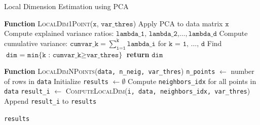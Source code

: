\documentclass[11pt,a4paper]{article}
\begin{document}
\begin{algorithm}
	\caption{Local Dimension Estimation using PCA}
	\label{alg:local-dim}
	\begin{algorithmic}[1]
		
		\State \textbf{Function} \textsc{LocalDim1Point}($\texttt{x}$, $\texttt{var\_thres}$)
		\State \hspace{0.5cm} Apply PCA to data matrix $\texttt{x}$
		\State \hspace{0.5cm} Compute explained variance ratios: $\texttt{lambda\_1, lambda\_2,} \ldots, \texttt{lambda\_d}$
		\State \hspace{0.5cm} Compute cumulative variance: $\texttt{cumvar\_k} = \sum_{\texttt{i=1}}^\texttt{k} \texttt{lambda\_i}$ for $\texttt{k = 1, }\ldots\texttt{, d}$
		\State \hspace{0.5cm} Find $\texttt{dim = min\{k : cumvar\_k} \geq \texttt{var\_thres\}}$
		\State \hspace{0.5cm} \textbf{return} $\texttt{dim}$
		\State
		


		\State \textbf{Function} \textsc{LocalDimNPoints}(\texttt{data, n\_neig, var\_thres})
		\State \hspace{0.5cm} \texttt{n\_points} $\leftarrow$ number of rows in \texttt{data}
		\State \hspace{0.5cm} Initialize \texttt{results} $\leftarrow \emptyset$
		\State \hspace{0.5cm} Compute \texttt{neighbors\_idx} for all points in \texttt{data}
		 
		\State \texttt{result\_i} $\leftarrow$ \textsc{ComputeLocalDim}(\texttt{i, data, neighbors\_idx, var\_thres})
		\State Append \texttt{result\_i} to \texttt{results}
		\EndFor

		
		\Return \texttt{results}
	\end{algorithmic}
\end{algorithm}
\end{document}
